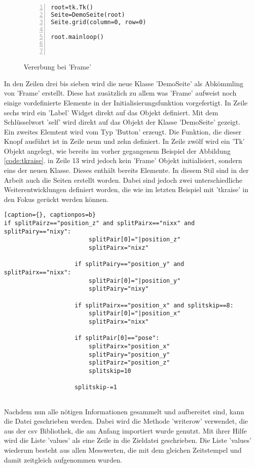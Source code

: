 \documentclass[11pt]{scrartcl}
\begin{document}
\begin{onehalfspace}
\begin{figure}[H]
\begin{lstlisting}[basicstyle=\small,numbers=left,stepnumber=1]
root=tk.Tk()
Seite=DemoSeite(root)
Seite.grid(column=0, row=0)

root.mainloop()



\end{lstlisting}
\caption{Vererbung bei 'Frame'}
\label{code:new_frame}
\end{figure}

In den Zeilen drei bis sieben wird die neue Klasse 'DemoSeite' als Abkömmling von 'Frame' erstellt. Diese hat zusätzlich zu allem was 'Frame' aufweist noch einige vordefinierte Elemente in der Initialisierungsfunktion vorgefertigt. In Zeile sechs wird ein 'Label' Widget direkt auf das Objekt definiert. Mit dem Schlüsselwort 'self'  wird direkt auf das Objekt der Klasse 'DemoSeite' gezeigt.
Ein zweites Elemtent wird vom Typ 'Button' erzeugt. Die Funktion, die dieser Knopf ausführt ist in Zeile neun und zehn definiert. In Zeile zwölf wird ein 'Tk' Objekt angelegt, wie bereits im vorher gegangenem Beispiel der Abbildung \ref{code:tkraise}. in Zeile 13 wird jedoch kein 'Frame' Objekt initialisiert, sondern eins der neuen Klasse. Dieses enthält bereits Elemente. In diesem Stil sind in der Arbeit auch die Seiten erstellt worden. Dabei sind jedoch zwei unterschiedliche Weiterentwicklungen definiert worden, die wie im letzten Beispiel mit 'tkraise' in den Fokus gerückt werden können.

\begin{lstlisting}[basicstyle=\small] [caption={}, captionpos=b}
if splitPairz=="position_z" and splitPairx=="nixx" and splitPairy=="nixy":
						splitPair[0]="|position_z"
						splitPairx="nixz"

					if splitPairy=="position_y" and splitPairx=="nixx":
						splitPair[0]="|position_y"
						splitPairy="nixy"

					if splitPairx=="position_x" and splitskip==8:
						splitPair[0]="|position_x"
						splitPairx="nixx"

					if splitPair[0]=="pose":
						splitPairx="position_x"
						splitPairy="position_y"
						splitPairz="position_z"
						splitskip=10

					splitskip-=1
					
\end{lstlisting}

Nachdem nun alle nötigen Informationen gesammelt und aufbereitet sind, kann die Datei geschrieben werden. Dabei wird die Methode 'writerow' verwendet, die aus der csv Bibliothek, die am Anfang importiert wurde genutzt. Mit ihrer Hilfe wird die Liste 'values' als eine Zeile in die Zieldatei geschrieben. Die Liste 'values' wiederum besteht aus allen Messwerten, die mit dem gleichen Zeitstempel und damit zeitgleich aufgenommen wurden.\\


\end{onehalfspace}
\end{document}
